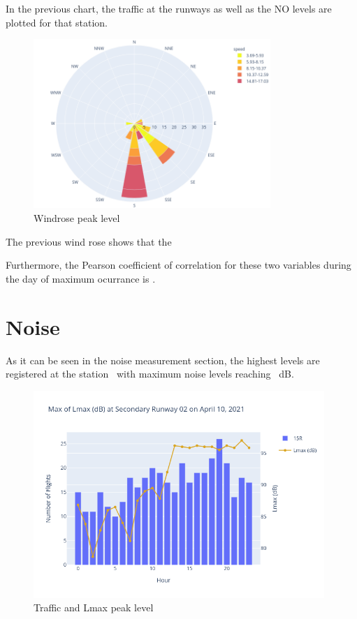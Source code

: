 \documentclass[12pt, oneside]{book}
\begin{document}
In the previous chart, the traffic at the runways as well as the NO levels are plotted for that station. 

{\begin{figure}[H]
\centering
\includegraphics[width=0.8\textwidth, keepaspectratio]{windroseNO}
\caption{Windrose  peak level}\label{windroseNO}
\end{figure}}{}

The previous wind rose shows that the \windNO

Furthermore, the Pearson coefficient of correlation for these two variables during the day of maximum ocurrance is \correlNO .


\section{Noise}

As it can be seen in the noise measurement section, the highest levels are registered at the station \stationMaxLeq\ with maximum noise levels reaching \maxNoiseValue\ dB.


{\begin{figure}[H]
\centering
\includegraphics[width=0.98\textwidth]{image21}
\caption{Traffic and Lmax peak level}\label{image21}
\end{figure}}{}
\end{document}
